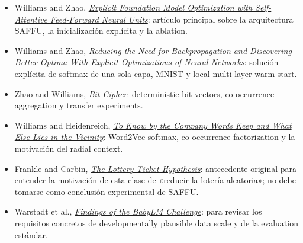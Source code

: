 \begingroup
\small
\setlength{\itemsep}{2pt}
\begin{itemize}
  \item Williams and Zhao, \href{https://arxiv.org/abs/2311.07510}{\emph{Explicit Foundation Model Optimization with Self-Attentive Feed-Forward Neural Units}}: artículo principal sobre la arquitectura SAFFU, la inicialización explícita y la ablation.
  \item Williams and Zhao, \href{https://arxiv.org/abs/2311.07498}{\emph{Reducing the Need for Backpropagation and Discovering Better Optima With Explicit Optimizations of Neural Networks}}: solución explícita de softmax de una sola capa, MNIST y local multi-layer warm start.
  \item Zhao and Williams, \href{https://arxiv.org/abs/2311.11012}{\emph{Bit Cipher}}: deterministic bit vectors, co-occurrence aggregation y transfer experiments.
  \item Williams and Heidenreich, \href{https://arxiv.org/abs/2205.00148}{\emph{To Know by the Company Words Keep and What Else Lies in the Vicinity}}: Word2Vec softmax, co-occurrence factorization y la motivación del radial context.
  \item Frankle and Carbin, \href{https://arxiv.org/abs/1803.03635}{\emph{The Lottery Ticket Hypothesis}}: antecedente original para entender la motivación de esta clase de «reducir la lotería aleatoria»; no debe tomarse como conclusión experimental de SAFFU.
  \item Warstadt et al., \href{https://arxiv.org/abs/2310.00915}{\emph{Findings of the BabyLM Challenge}}: para revisar los requisitos concretos de developmentally plausible data scale y de la evaluation estándar.
\end{itemize}
\endgroup


